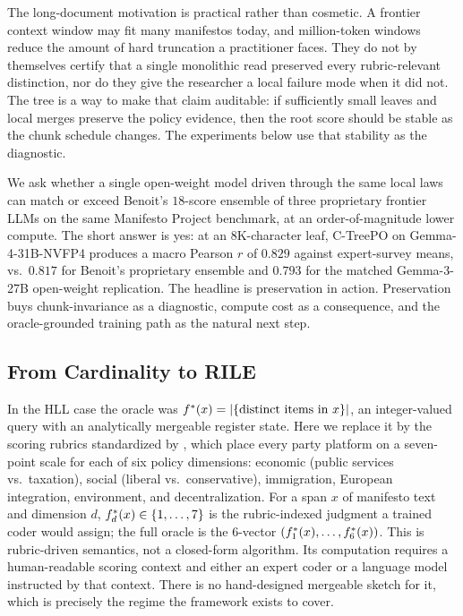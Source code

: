 The long-document motivation is practical rather than cosmetic. A
frontier context window may fit many manifestos today, and million-token
windows reduce the amount of hard truncation a practitioner faces. They do
not by themselves certify that a single monolithic read preserved every
rubric-relevant distinction, nor do they give the researcher a local
failure mode when it did not. The tree is a way to make that claim
auditable: if sufficiently small leaves and local merges preserve the
policy evidence, then the root score should be stable as the chunk
schedule changes. The experiments below use that stability as the
diagnostic.

We ask whether a single open-weight model driven through the same local laws can match or exceed Benoit's $18$-score ensemble of three proprietary frontier LLMs on the same Manifesto Project benchmark, at an order-of-magnitude lower compute. The short answer is yes: at an $8\mathrm{K}$-character leaf, C-TreePO on Gemma-4-31B-NVFP4 produces a macro Pearson $r$ of $0.829$ against expert-survey means, vs.\ $0.817$ for Benoit's proprietary ensemble and $0.793$ for the matched Gemma-3-27B open-weight replication. The headline is preservation in action. Preservation buys chunk-invariance as a diagnostic, compute cost as a consequence, and the oracle-grounded training path as the natural next step.

\subsection{From Cardinality to RILE}

In the HLL case the oracle was
$f^\ast(x) = |\{\text{distinct items in } x\}|$, an integer-valued query
with an analytically mergeable register state. Here we replace it by
the scoring rubrics standardized by \citet{BenoitEtAl2025}, which place
every party platform on a seven-point scale for each of six policy
dimensions: economic (public services vs.\ taxation), social
(liberal vs.\ conservative), immigration, European integration,
environment, and decentralization. For a span $x$ of manifesto text and
dimension $d$, $f^\ast_d(x) \in \{1,\dots,7\}$ is the rubric-indexed
judgment a trained coder would assign; the full oracle is the $6$-vector
$(f^\ast_1(x),\dots,f^\ast_6(x))$. This is rubric-driven semantics, not
a closed-form algorithm. Its computation requires a human-readable
scoring context and either an expert coder or a language model
instructed by that context. There is no hand-designed mergeable sketch
for it, which is precisely the regime the framework exists to cover.

